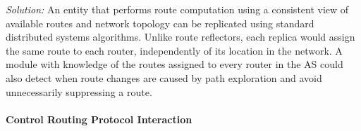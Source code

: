\vspace{0.05in}
\noindent
{\em Solution:} 
An entity that performs route
computation using a consistent view of available routes and network
topology can be replicated using standard distributed 
systems algorithms. Unlike route reflectors, each replica would assign
the same route to each router, independently of its location in the
network.
A module with knowledge of the routes assigned to every router in the
AS could also detect when route changes are caused by path exploration and
avoid unnecessarily suppressing a route.

\vspace{0.05in}



\paragraph{Control Routing Protocol Interaction}\label{sec:layer}

